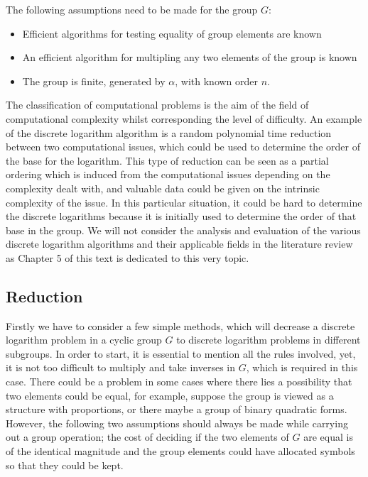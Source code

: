 \documentclass[iwp,first]{luthesis}
\begin{document}
The following assumptions need to be made for the group $G$:

\begin{itemize}

\item Efficient algorithms for testing equality of group elements are known
\item An efficient algorithm for multipling any two elements of the group is known
\item The group is finite, generated by $\alpha$, with known order $n$.

\end{itemize}

The classification of computational problems is the aim of the field of computational complexity whilst corresponding the level of difficulty. An example of the discrete logarithm algorithm is a random polynomial time reduction between two computational issues, which could be used to determine the order of the base for the logarithm. This type of reduction can be seen as a partial ordering which is induced from the computational issues depending on the complexity dealt with, and valuable data could be given on the intrinsic complexity of the issue.  In this particular situation, it could be hard to determine the discrete logarithms because it is initially used to determine the order of that base in the group. We will not consider the analysis and evaluation of the various discrete logarithm algorithms and their applicable fields in the literature review as Chapter 5 of this text is dedicated to this very topic.

\subsection{Reduction}

Firstly we have to consider a few simple methods, which will decrease a discrete logarithm problem in a cyclic group $G$ to discrete logarithm problems in different subgroups. In order to start, it is essential to mention all the rules involved, yet, it is not too difficult to multiply and take inverses in $G$, which is required in this case. There could be a problem in some cases where there lies a possibility that two elements could be equal, for example, suppose the group is viewed as a structure with proportions, or there maybe a group of binary quadratic forms. However, the following two assumptions should always be made while carrying out a group operation; the cost of deciding if the two elements of $G$ are equal is of the identical magnitude and the group elements could have allocated symbols so that they could be kept. 
\end{document}
